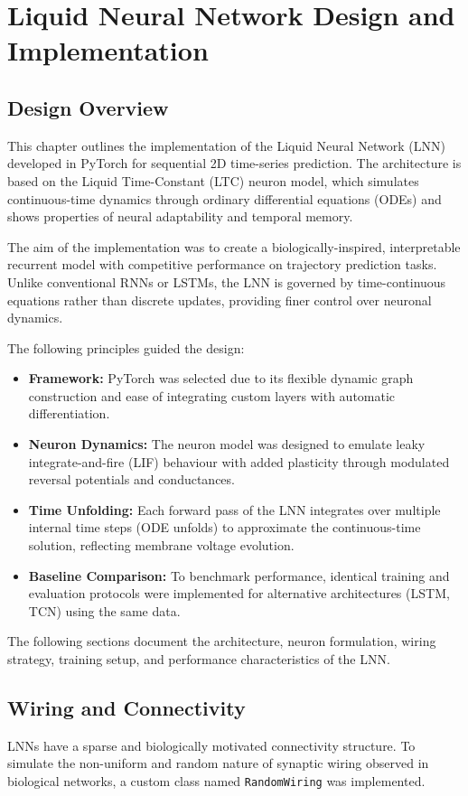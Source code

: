 \chapter{Liquid Neural Network Design and Implementation}

\section{Design Overview}
This chapter outlines the implementation of the Liquid Neural Network (LNN) developed in PyTorch for sequential 2D time-series prediction. The architecture is based on the Liquid Time-Constant (LTC) neuron model, which simulates continuous-time dynamics through ordinary differential equations (ODEs) and shows properties of neural adaptability and temporal memory.

The aim of the implementation was to create a biologically-inspired, interpretable recurrent model with competitive performance on trajectory prediction tasks. Unlike conventional RNNs or LSTMs, the LNN is governed by time-continuous equations rather than discrete updates, providing finer control over neuronal dynamics.

\vspace{1em}
\noindent The following principles guided the design:
\begin{itemize}
    \item \textbf{Framework:} PyTorch was selected due to its flexible dynamic graph construction and ease of integrating custom layers with automatic differentiation.
    \item \textbf{Neuron Dynamics:} The neuron model was designed to emulate leaky integrate-and-fire (LIF) behaviour with added plasticity through modulated reversal potentials and conductances.
    \item \textbf{Time Unfolding:} Each forward pass of the LNN integrates over multiple internal time steps (ODE unfolds) to approximate the continuous-time solution, reflecting membrane voltage evolution.
    \item \textbf{Baseline Comparison:} To benchmark performance, identical training and evaluation protocols were implemented for alternative architectures (LSTM, TCN) using the same data.
\end{itemize}

The following sections document the architecture, neuron formulation, wiring strategy, training setup, and performance characteristics of the LNN.

\section{Wiring and Connectivity}
LNNs have a sparse and biologically motivated connectivity structure. To simulate the non-uniform and random nature of synaptic wiring observed in biological networks, a custom class named \texttt{RandomWiring} was implemented.

